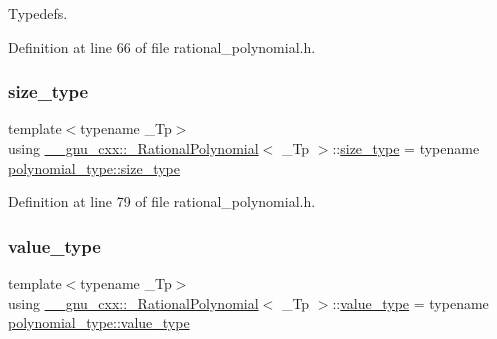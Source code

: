 Typedefs. 

Definition at line 66 of file rational\+\_\+polynomial.\+h.

\mbox{\label{class____gnu__cxx_1_1__RationalPolynomial_aaba2b07e6b5f33be46c30b5d0eac6da4}} 
\subsubsection{\texorpdfstring{size\+\_\+type}{size\_type}}
{\footnotesize\ttfamily template$<$typename \+\_\+\+Tp$>$ \\
using \hyperlink{class____gnu__cxx_1_1__RationalPolynomial}{\+\_\+\+\_\+gnu\+\_\+cxx\+::\+\_\+\+Rational\+Polynomial}$<$ \+\_\+\+Tp $>$\+::\hyperlink{class____gnu__cxx_1_1__RationalPolynomial_aaba2b07e6b5f33be46c30b5d0eac6da4}{size\+\_\+type} =  typename \hyperlink{class____gnu__cxx_1_1__Polynomial_a6afe219c123c7a2fdc5abac8a6639053}{polynomial\+\_\+type\+::size\+\_\+type}}



Definition at line 79 of file rational\+\_\+polynomial.\+h.

\mbox{\label{class____gnu__cxx_1_1__RationalPolynomial_adeec7f1bec03111031599f337848ee8b}} 
\subsubsection{\texorpdfstring{value\+\_\+type}{value\_type}}
{\footnotesize\ttfamily template$<$typename \+\_\+\+Tp$>$ \\
using \hyperlink{class____gnu__cxx_1_1__RationalPolynomial}{\+\_\+\+\_\+gnu\+\_\+cxx\+::\+\_\+\+Rational\+Polynomial}$<$ \+\_\+\+Tp $>$\+::\hyperlink{class____gnu__cxx_1_1__RationalPolynomial_adeec7f1bec03111031599f337848ee8b}{value\+\_\+type} =  typename \hyperlink{class____gnu__cxx_1_1__Polynomial_a725563351f50e76084a7a016c06f8a53}{polynomial\+\_\+type\+::value\+\_\+type}}



